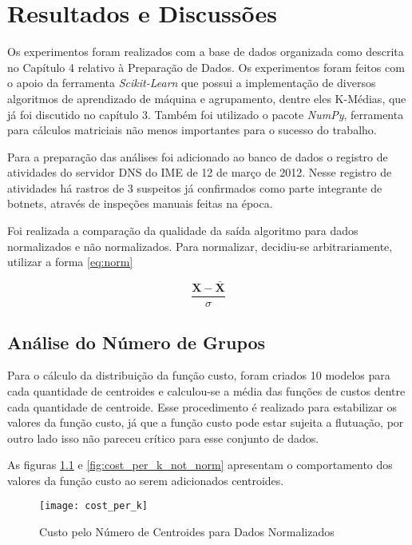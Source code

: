\chapter{Resultados e Discussões}\label{ch:discussion}

Os experimentos foram realizados com a base de dados organizada como descrita no Capítulo 4 relativo à Preparação de Dados. Os experimentos foram feitos com o apoio da ferramenta \textit{Scikit-Learn} que possui a implementação de diversos algoritmos de aprendizado de máquina e agrupamento, dentre eles K-Médias, que já foi discutido no capítulo 3. Também foi utilizado o pacote \textit{NumPy}, ferramenta para cálculos matriciais não menos importantes para o sucesso do trabalho.

Para a preparação das análises foi adicionado ao banco de dados o registro de atividades do servidor DNS do IME de 12 de março de 2012. Nesse registro de atividades há rastros de 3 suspeitos já confirmados como parte integrante de botnets, através de inspeções manuais feitas na época.

Foi realizada a comparação da qualidade da saída algoritmo para dados normalizados e não normalizados. Para normalizar, decidiu-se arbitrariamente, utilizar a forma \ref{eq:norm}

\begin{equation} \label{eq:norm}
\frac{\mathbf{X} - \mathbf{\bar{X}}}{\sigma}
\end{equation}

\section{Análise do Número de Grupos}

Para o cálculo da distribuição da função custo, foram criados 10 modelos para cada quantidade de centroides e calculou-se a média das funções de custos dentre cada quantidade de centroide. Esse procedimento é realizado para estabilizar os valores da função custo, já que a função custo pode estar sujeita a flutuação, por outro lado isso não pareceu crítico para esse conjunto de dados.

As figuras \ref{fig:cost_per_k} e \ref{fig:cost_per_k_not_norm} apresentam o comportamento dos valores da função custo ao serem adicionados centroides.

\begin{figure}[htbp]
\centering
\texttt{[image: cost\_per\_k]}
\caption[Custo pelo Número de Centroides para Dados Normalizados]{Custo pelo Número de Centroides para Dados Normalizados} \label{fig:cost_per_k}
\end{figure}

